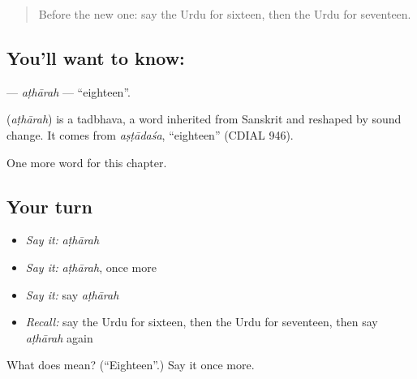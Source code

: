 \begin{quote}
Before the new one: say the Urdu for sixteen, then the Urdu for seventeen.
\end{quote}

\subsection*{You'll want to know: }
\textbf{} — \emph{aṭhārah} — \textquotedblleft{}eighteen\textquotedblright{}.

\begin{cousinweb}
\textbf{} (\emph{aṭhārah}) is a tadbhava, a word inherited from Sanskrit and reshaped by sound change. It comes from \emph{aṣṭādaśa}, \textquotedblleft{}eighteen\textquotedblright{} (CDIAL 946).
\end{cousinweb}

\begin{grammarlens}[title={What you've built}]
One more word for this chapter.
\end{grammarlens}

\subsection*{Your turn}
\begin{itemize}
\raggedright
  \item \emph{Say it:} \emph{aṭhārah}
  \item \emph{Say it:} \emph{aṭhārah}, once more
  \item \emph{Say it:} say \emph{aṭhārah}
  \item \emph{Recall:} say the Urdu for sixteen, then the Urdu for seventeen, then say \emph{aṭhārah} again
\end{itemize}

\begin{tcolorbox}[breakable,colback=teal!4,colframe=teal!35!black,title={Before you move on}]
What does  mean? (\textquotedblleft{}Eighteen\textquotedblright{}.) Say it once more.
\end{tcolorbox}
